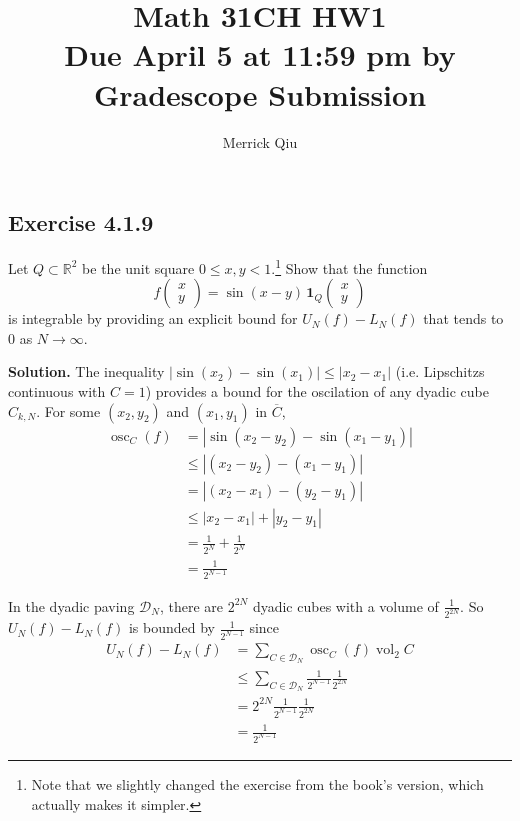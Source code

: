 \documentclass{article}
\title{Math 31CH HW1 \\ Due April 5 at 11:59 pm by Gradescope Submission}
\author{Merrick Qiu}
\DeclareMathOperator{\vol}{vol}
\DeclareMathOperator{\osc}{osc}
\newcommand{\dypaving}{\mathcal{D}_N}
\begin{document}
\maketitle
\newpage



\subsection*{Exercise 4.1.9}
Let $Q 
\subset 
\mathbb{R}^2$ be the unit square $0 \leq x, y < 1$.\footnote{Note that we slightly changed the exercise from the book's version, which actually makes it simpler.} Show that the function
$$f\begin{pmatrix} x\\y\end{pmatrix}  = \sin(x - y)
\,
\mathbf{1}_Q
\begin{pmatrix} x\\y\end{pmatrix}$$
is integrable by providing an explicit bound for $U_N(f) - L_N(f)$ that tends to $0$
as $N \to \infty$.\medskip 

\textbf{Solution.}
The inequality $|\sin(x_2)-\sin(x_1)| \leq |x_2 - x_1|$ 
(i.e. Lipschitzs continuous with $C=1$)
provides a bound for the oscilation of any dyadic cube $C_{k, N}$.
For some $(x_2, y_2)$ and $(x_1, y_1)$ in $\overline{C}$,
\begin{align*}
    \osc_C(f)
    &= |\sin(x_2-y_2)-\sin(x_1-y_1)| \\
    &\leq |(x_2-y_2)-(x_1-y_1)| \\
    &= |(x_2-x_1)-(y_2-y_1)| \\
    &\leq |x_2-x_1| + |y_2-y_1| \\
    &= \frac{1}{2^N} + \frac{1}{2^N} \\ 
    &= \frac{1}{2^{N-1}}
\end{align*}

In the dyadic paving $\dypaving$, 
there are $2^{2N}$ dyadic cubes 
with a volume of $\frac{1}{2^{2N}}$.
So $U_N(f) - L_N(f)$ is bounded by $\frac{1}{2^{N-1}}$ since 
\begin{align*}
    U_N(f) - L_N(f)
    &= \sum_{C \in \dypaving} \osc_C(f) \vol_2 C \\
    &\leq \sum_{C \in \dypaving} \frac{1}{2^{N-1}} \frac{1}{2^{2N}} \\
    &= 2^{2N} \frac{1}{2^{N-1}} \frac{1}{2^{2N}} \\
    &= \frac{1}{2^{N-1}}
\end{align*}
\end{document}

